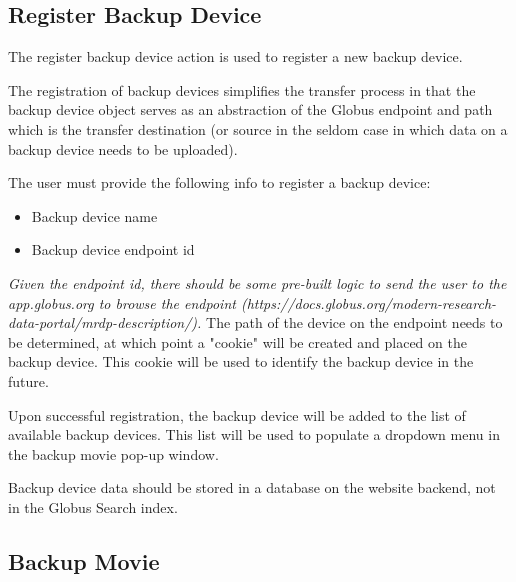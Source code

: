 \subsection{Register Backup Device}

The register backup device action is used to register a new backup device.

The registration of backup devices simplifies the transfer process in that the 
backup device object serves as an abstraction of the Globus endpoint and path 
which is the transfer destination (or source in the seldom case in which data on 
a backup device needs to be uploaded).

The user must provide the following info to register a backup device:
\begin{itemize}
    \item Backup device name
    \item Backup device endpoint id
\end{itemize}

\noindent \emph{Given the endpoint id, there should be some pre-built logic to send the user to
the app.globus.org to browse the endpoint (https://docs.globus.org/modern-research-data-portal/mrdp-description/).}
The path of the device on the endpoint needs to be determined, at which point
a "cookie" will be created and placed on the backup device. This cookie will
be used to identify the backup device in the future.

Upon successful registration, the backup device will be added to the list of
available backup devices. This list will be used to populate a dropdown menu
in the backup movie pop-up window.

Backup device data should be stored in a database on the website backend, not in
the Globus Search index.

\subsection{Backup Movie}
